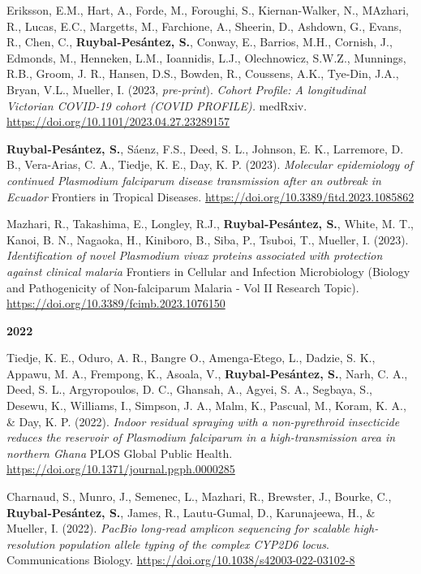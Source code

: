 \documentclass[11pt,a4paper,]{awesome-cv}
\begin{document}
Eriksson, E.M., Hart, A., Forde, M., Foroughi, S., Kiernan-Walker, N.,
MAzhari, R., Lucas, E.C., Margetts, M., Farchione, A., Sheerin, D.,
Ashdown, G., Evans, R., Chen, C., \textbf{Ruybal‐Pesántez, S.}, Conway,
E., Barrios, M.H., Cornish, J., Edmonds, M., Henneken, L.M., Ioannidis,
L.J., Olechnowicz, S.W.Z., Munnings, R.B., Groom, J. R., Hansen, D.S.,
Bowden, R., Coussens, A.K., Tye-Din, J.A., Bryan, V.L., Mueller, I.
(2023, \emph{pre-print}). \emph{Cohort Profile: A longitudinal Victorian
COVID-19 cohort (COVID PROFILE).} medRxiv.
\url{https://doi.org/10.1101/2023.04.27.23289157}

\textbf{Ruybal‐Pesántez, S.}, Sáenz, F.S., Deed, S. L., Johnson, E. K.,
Larremore, D. B., Vera-Arias, C. A., Tiedje, K. E., Day, K. P. (2023).
\emph{Molecular epidemiology of continued Plasmodium falciparum disease
transmission after an outbreak in Ecuador} Frontiers in Tropical
Diseases. \url{https://doi.org/10.3389/fitd.2023.1085862}

Mazhari, R., Takashima, E., Longley, R.J., \textbf{Ruybal‐Pesántez, S.},
White, M. T., Kanoi, B. N., Nagaoka, H., Kiniboro, B., Siba, P., Tsuboi,
T., Mueller, I. (2023). \emph{Identification of novel Plasmodium vivax
proteins associated with protection against clinical malaria} Frontiers
in Cellular and Infection Microbiology (Biology and Pathogenicity of
Non-falciparum Malaria - Vol II Research Topic).
\url{https://doi.org/10.3389/fcimb.2023.1076150}

\setlength{\leftskip}{0cm}

\textbf{2022}

\setlength{\leftskip}{1cm}

Tiedje, K. E., Oduro, A. R., Bangre O., Amenga‐Etego, L., Dadzie, S. K.,
Appawu, M. A., Frempong, K., Asoala, V., \textbf{Ruybal‐Pesántez, S.},
Narh, C. A., Deed, S. L., Argyropoulos, D. C., Ghansah, A., Agyei, S.
A., Segbaya, S., Desewu, K., Williams, I., Simpson, J. A., Malm, K.,
Pascual, M., Koram, K. A., \& Day, K. P. (2022). \emph{Indoor residual
spraying with a non-pyrethroid insecticide reduces the reservoir of
Plasmodium falciparum in a high-transmission area in northern Ghana}
PLOS Global Public Health.
\url{https://doi.org/10.1371/journal.pgph.0000285}

Charnaud, S., Munro, J., Semenec, L., Mazhari, R., Brewster, J., Bourke,
C., \textbf{Ruybal‐Pesántez, S.}, James, R., Lautu‐Gumal, D.,
Karunajeewa, H., \& Mueller, I. (2022). \emph{PacBio long‐read amplicon
sequencing for scalable high‐resolution population allele typing of the
complex CYP2D6 locus}. Communications Biology.
\url{https://doi.org/10.1038/s42003-022-03102-8}
\end{document}
